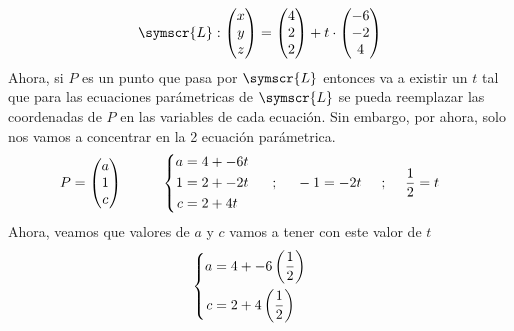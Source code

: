 \documentclass{article}
\def\fancyL{\symscr{L}}
\begin{document}
\begin{enumerate}
\[            \fancyL :
            \begin{pmatrix}x \\ y \\ z\end{pmatrix}
                =
            \begin{pmatrix}4 \\ 2 \\ 2\end{pmatrix}
                +
            t \cdot \begin{pmatrix}-6 \\ -2 \\ 4\end{pmatrix}
        \]
        Ahora, si \(P\) es un punto que pasa por \(\fancyL\) entonces va a existir un \(t\) tal que para las ecuaciones parámetricas de \(\fancyL\)
        se pueda reemplazar las coordenadas de \(P\) en las variables de cada ecuación. Sin embargo, por ahora, solo nos vamos a concentrar en la 2 ecuación parámetrica.
        \[
            P = \begin{pmatrix}a \\ 1 \\ c\end{pmatrix}
            \hspace{1cm}
            \left\{
            \begin{aligned}
                a &= 4 + -6t \\
                1 &= 2 + -2t \\
                c &= 2 + 4t
            \end{aligned}
            \right.
            \hspace{0.5cm}
            \text{;}
            \hspace{0.5cm}
            -1 = -2t
            \hspace{0.5cm}
            \text{;}
            \hspace{0.5cm}
            \frac{1}{2} = t
            \hspace{0.5cm}
        \]
        Ahora, veamos que valores de \(a\) y \(c\) vamos a tener con este valor de \(t\)
        \[
            \left\{
            \begin{aligned}
                a &= 4 + -6\left(\frac{1}{2}\right) \\
                c &= 2 + 4\left(\frac{1}{2}\right)
            \end{aligned}
            \right.
            \hspace{0.5cm}
\]
\end{enumerate}
\end{document}
